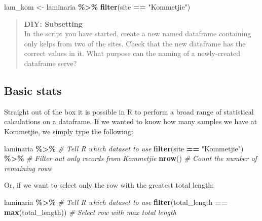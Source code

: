 \documentclass[
]{book}
\newenvironment{Shaded}{\begin{snugshade}}{\end{snugshade}}
\newcommand{\CommentTok}[1]{\textcolor[rgb]{0.56,0.35,0.01}{\textit{#1}}}
\newcommand{\KeywordTok}[1]{\textcolor[rgb]{0.13,0.29,0.53}{\textbf{#1}}}
\newcommand{\NormalTok}[1]{#1}
\newcommand{\OperatorTok}[1]{\textcolor[rgb]{0.81,0.36,0.00}{\textbf{#1}}}
\newcommand{\StringTok}[1]{\textcolor[rgb]{0.31,0.60,0.02}{#1}}
\begin{document}
\begin{Shaded}
\begin{Highlighting}[]
\NormalTok{lam\_kom <{-}}\StringTok{ }\NormalTok{laminaria }\OperatorTok{\%>\%}\StringTok{ }
\StringTok{  }\KeywordTok{filter}\NormalTok{(site }\OperatorTok{==}\StringTok{ "Kommetjie"}\NormalTok{)}
\end{Highlighting}
\end{Shaded}

\begin{quote}
\textbf{DIY: Subsetting}\\
In the script you have started, create a new named dataframe containing only kelps from two of the sites. Check that the new dataframe has the correct values in it. What purpose can the naming of a newly-created dataframe serve?
\end{quote}

\hypertarget{basic-stats}{%
\subsection{Basic stats}\label{basic-stats}}

Straight out of the box it is possible in R to perform a broad range of statistical calculations on a dataframe. If we wanted to know how many samples we have at Kommetjie, we simply type the following:

\begin{Shaded}
\begin{Highlighting}[]
\NormalTok{laminaria }\OperatorTok{\%>\%}\StringTok{ }\CommentTok{\# Tell R which dataset to use}
\StringTok{  }\KeywordTok{filter}\NormalTok{(site }\OperatorTok{==}\StringTok{ "Kommetjie"}\NormalTok{) }\OperatorTok{\%>\%}\StringTok{ }\CommentTok{\# Filter out only records from Kommetjie}
\StringTok{  }\KeywordTok{nrow}\NormalTok{() }\CommentTok{\# Count the number of remaining rows}
\end{Highlighting}
\end{Shaded}

Or, if we want to select only the row with the greatest total length:

\begin{Shaded}
\begin{Highlighting}[]
\NormalTok{laminaria }\OperatorTok{\%>\%}\StringTok{ }\CommentTok{\# Tell R which dataset to use}
\StringTok{  }\KeywordTok{filter}\NormalTok{(total\_length }\OperatorTok{==}\StringTok{ }\KeywordTok{max}\NormalTok{(total\_length)) }\CommentTok{\# Select row with max total length}
\end{Highlighting}
\end{Shaded}
\end{document}
